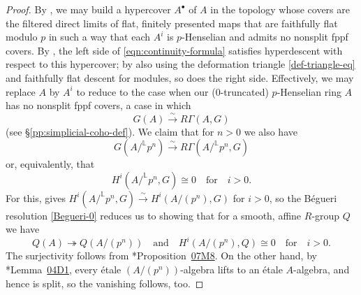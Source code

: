 \documentclass[11pt, reqno]{amsart}
\newcommand{\kestutis}[1]{{\color{Plum} \sf \it{ {\scriptsize ``#1''} }}}
\newcommand{\bL}{\mathbb{L}}
\newcommand{\isomto}{\overset{\sim}{\longrightarrow}}
\newcommand{\ra}{\rightarrow}
\newcommand{\surjects}{\twoheadrightarrow}
\providecommand{\qxq}[1]{\quad\text{#1}\quad}
\newcommand{\be}{\begin{equation}}
\newcommand{\ee}{\end{equation}}
\numberwithin{equation}{numberingbase}
\theoremstyle{thms}
\theoremstyle{claims}
\theoremstyle{defs}
\theoremstyle{thms}
\theoremstyle{defs}
\theoremstyle{subsection-tweak}
\theoremstyle{subsection-tweak}
\begin{document}
\begin{proof}
By , we may build a hypercover $A^\bullet$ of $A$ in the topology whose covers are the filtered direct limits of flat, finitely presented maps that are faithfully flat modulo $p$ in such a way that each $A^i$ is $p$-Henselian and admits no nonsplit fppf covers. By , the left side of \eqref{eqn:continuity-formula} satisfies hyperdescent with respect to this hypercover; by also using the deformation triangle \eqref{def-triangle-eq} and faithfully flat descent for modules, so does the right side. %
Effectively, we may replace $A$ by $A^i$ to reduce to the case when our ($0$-truncated) $p$-Henselian ring $A$ has no nonsplit fppf covers, a case in which
\be \label{eqn:dream-cohomology}
G(A) \isomto R\Gamma(A,G)
 \ee
(see \S\ref{pp:simplicial-coho-def}). We claim that for $n > 0$ we also have
\be \label{eqn:mod-pn-desire}
G(A/^\bL p^n) \isomto R\Gamma(A/^\bL p^n,G)
\ee
or, equivalently, that
\[
H^i(A/^\bL p^n,G)\cong0 \qxq{for} i>0.
\]
For this,  gives $H^i(A/^\bL p^n,G) \isomto H^i(A/(p^n),G)$ for $i > 0$, so the B\'{e}gueri resolution \eqref{Begueri-0} reduces us to showing that for a smooth, affine $R$-group $Q$ we have 
\[
Q(A) \surjects Q(A/(p^n)) \qxq{and} H^i(A/(p^n), Q) \cong 0 \qxq{for} i > 0.
\]
The surjectivity follows from \cite{SP}*{Proposition~\href{https://stacks.math.columbia.edu/tag/07M8}{07M8}}. On the other hand, by %
\cite{SP}*{Lemma~\href{https://stacks.math.columbia.edu/tag/04D1}{04D1}}, every \'etale $(A/(p^n))$-algebra lifts to an \'{e}tale $A$-algebra, and hence is split, so the vanishing follows, too.


\end{proof}
\end{document}
